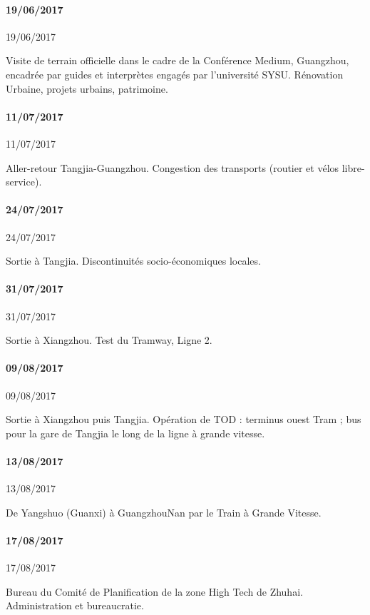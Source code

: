 \paragraph{19/06/2017}{19/06/2017}

Visite de terrain officielle dans le cadre de la Conférence Medium, Guangzhou, encadrée par guides et interprètes engagés par l'université SYSU. Rénovation Urbaine, projets urbains, patrimoine.


\paragraph{11/07/2017}{11/07/2017}

Aller-retour Tangjia-Guangzhou. Congestion des transports (routier et vélos libre-service).


\paragraph{24/07/2017}{24/07/2017}


Sortie à Tangjia. Discontinuités socio-économiques locales.


\paragraph{31/07/2017}{31/07/2017}

Sortie à Xiangzhou. Test du Tramway, Ligne 2.



\paragraph{09/08/2017}{09/08/2017}

Sortie à Xiangzhou puis Tangjia. Opération de TOD : terminus ouest Tram ; bus pour la gare de Tangjia le long de la ligne à grande vitesse.


\paragraph{13/08/2017}{13/08/2017}

De Yangshuo (Guanxi) à GuangzhouNan par le Train à Grande Vitesse.




\paragraph{17/08/2017}{17/08/2017}


Bureau du Comité de Planification de la zone High Tech de Zhuhai. Administration et bureaucratie.



